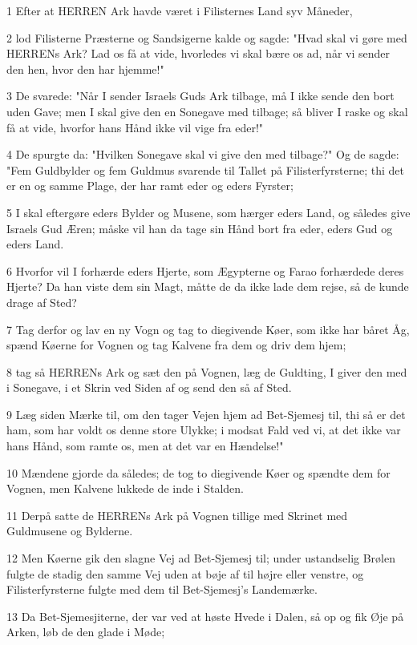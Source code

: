 \par 1 Efter at HERREN Ark havde været i Filisternes Land syv Måneder,
\par 2 lod Filisterne Præsterne og Sandsigerne kalde og sagde: "Hvad skal vi gøre med HERRENs Ark? Lad os få at vide, hvorledes vi skal bære os ad, når vi sender den hen, hvor den har hjemme!"
\par 3 De svarede: "Når I sender Israels Guds Ark tilbage, må I ikke sende den bort uden Gave; men I skal give den en Sonegave med tilbage; så bliver I raske og skal få at vide, hvorfor hans Hånd ikke vil vige fra eder!"
\par 4 De spurgte da: "Hvilken Sonegave skal vi give den med tilbage?" Og de sagde: "Fem Guldbylder og fem Guldmus svarende til Tallet på Filisterfyrsterne; thi det er en og samme Plage, der har ramt eder og eders Fyrster;
\par 5 I skal eftergøre eders Bylder og Musene, som hærger eders Land, og således give Israels Gud Æren; måske vil han da tage sin Hånd bort fra eder, eders Gud og eders Land.
\par 6 Hvorfor vil I forhærde eders Hjerte, som Ægypterne og Farao forhærdede deres Hjerte? Da han viste dem sin Magt, måtte de da ikke lade dem rejse, så de kunde drage af Sted?
\par 7 Tag derfor og lav en ny Vogn og tag to diegivende Køer, som ikke har båret Åg, spænd Køerne for Vognen og tag Kalvene fra dem og driv dem hjem;
\par 8 tag så HERRENs Ark og sæt den på Vognen, læg de Guldting, I giver den med i Sonegave, i et Skrin ved Siden af og send den så af Sted.
\par 9 Læg siden Mærke til, om den tager Vejen hjem ad Bet-Sjemesj til, thi så er det ham, som har voldt os denne store Ulykke; i modsat Fald ved vi, at det ikke var hans Hånd, som ramte os, men at det var en Hændelse!"
\par 10 Mændene gjorde da således; de tog to diegivende Køer og spændte dem for Vognen, men Kalvene lukkede de inde i Stalden.
\par 11 Derpå satte de HERRENs Ark på Vognen tillige med Skrinet med Guldmusene og Bylderne.
\par 12 Men Køerne gik den slagne Vej ad Bet-Sjemesj til; under ustandselig Brølen fulgte de stadig den samme Vej uden at bøje af til højre eller venstre, og Filisterfyrsterne fulgte med dem til Bet-Sjemesj's Landemærke.
\par 13 Da Bet-Sjemesjiterne, der var ved at høste Hvede i Dalen, så op og fik Øje på Arken, løb de den glade i Møde;
